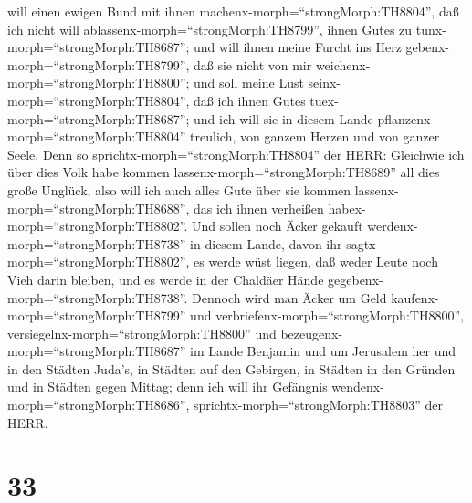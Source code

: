 will einen ewigen Bund mit ihnen machenx-morph=``strongMorph:TH8804'',
daß ich nicht will ablassenx-morph=``strongMorph:TH8799'', ihnen Gutes
zu tunx-morph=``strongMorph:TH8687''; und will ihnen meine Furcht ins
Herz gebenx-morph=``strongMorph:TH8799'', daß sie nicht von mir
weichenx-morph=``strongMorph:TH8800'';  und soll meine Lust
seinx-morph=``strongMorph:TH8804'', daß ich ihnen Gutes
tuex-morph=``strongMorph:TH8687''; und ich will sie in diesem Lande
pflanzenx-morph=``strongMorph:TH8804'' treulich, von ganzem Herzen und
von ganzer Seele.  Denn so
sprichtx-morph=``strongMorph:TH8804'' der HERR: Gleichwie ich über dies
Volk habe kommen lassenx-morph=``strongMorph:TH8689'' all dies große
Unglück, also will ich auch alles Gute über sie kommen
lassenx-morph=``strongMorph:TH8688'', das ich ihnen verheißen
habex-morph=``strongMorph:TH8802''.  Und sollen noch Äcker
gekauft werdenx-morph=``strongMorph:TH8738'' in diesem Lande, davon ihr
sagtx-morph=``strongMorph:TH8802'', es werde wüst liegen, daß weder
Leute noch Vieh darin bleiben, und es werde in der Chaldäer Hände
gegebenx-morph=``strongMorph:TH8738''.  Dennoch wird man
Äcker um Geld kaufenx-morph=``strongMorph:TH8799'' und
verbriefenx-morph=``strongMorph:TH8800'',
versiegelnx-morph=``strongMorph:TH8800'' und
bezeugenx-morph=``strongMorph:TH8687'' im Lande Benjamin und um
Jerusalem her und in den Städten Juda's, in Städten auf den Gebirgen, in
Städten in den Gründen und in Städten gegen Mittag; denn ich will ihr
Gefängnis wendenx-morph=``strongMorph:TH8686'',
sprichtx-morph=``strongMorph:TH8803'' der HERR.

\hypertarget{section-32}{%
\section{33}\label{section-32}}

